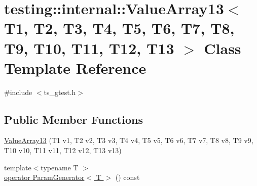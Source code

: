 \hypertarget{classtesting_1_1internal_1_1ValueArray13}{\section{testing\-:\-:internal\-:\-:Value\-Array13$<$ T1, T2, T3, T4, T5, T6, T7, T8, T9, T10, T11, T12, T13 $>$ Class Template Reference}
\label{classtesting_1_1internal_1_1ValueArray13}
}


{\ttfamily \#include $<$ts\-\_\-gtest.\-h$>$}

\subsection*{Public Member Functions}
\begin{DoxyCompactItemize}
\item 
\hyperlink{classtesting_1_1internal_1_1ValueArray13_a57505ac7a4fbb86f4121bf1d41b0352d}{Value\-Array13} (T1 v1, T2 v2, T3 v3, T4 v4, T5 v5, T6 v6, T7 v7, T8 v8, T9 v9, T10 v10, T11 v11, T12 v12, T13 v13)
\item 
{\footnotesize template$<$typename T $>$ }\\\hyperlink{classtesting_1_1internal_1_1ValueArray13_a7de4be3c2608feeffd479e3873e3fc87}{operator Param\-Generator$<$ T $>$} () const 
\end{DoxyCompactItemize}


